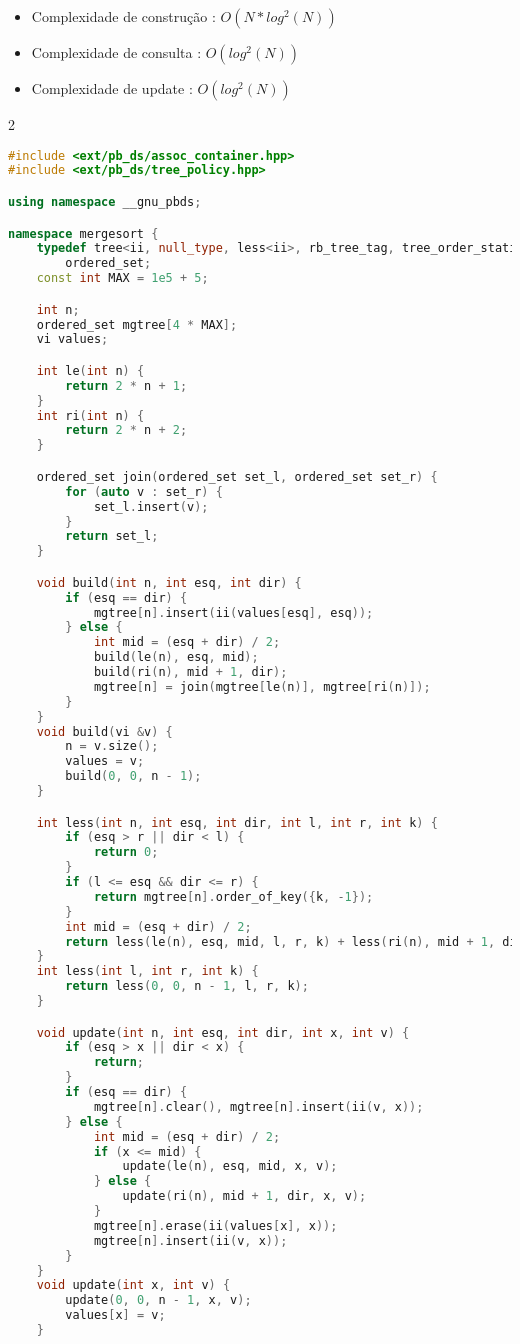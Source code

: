 \documentclass[11pt, a4paper, oneside]{book}
\begin{document}
\begin{itemize}
\item Complexidade de construção : $O(N * log^2(N))$
\item Complexidade de consulta : $O(log^2(N))$
\item Complexidade de update : $O(log^2(N))$
\end{itemize}

\hfill

\begin{multicols}{2}
\begin{lstlisting}[language=C++]
#include <ext/pb_ds/assoc_container.hpp>
#include <ext/pb_ds/tree_policy.hpp>

using namespace __gnu_pbds;

namespace mergesort {
    typedef tree<ii, null_type, less<ii>, rb_tree_tag, tree_order_statistics_node_update>
        ordered_set;
    const int MAX = 1e5 + 5;

    int n;
    ordered_set mgtree[4 * MAX];
    vi values;

    int le(int n) {
        return 2 * n + 1;
    }
    int ri(int n) {
        return 2 * n + 2;
    }

    ordered_set join(ordered_set set_l, ordered_set set_r) {
        for (auto v : set_r) {
            set_l.insert(v);
        }
        return set_l;
    }

    void build(int n, int esq, int dir) {
        if (esq == dir) {
            mgtree[n].insert(ii(values[esq], esq));
        } else {
            int mid = (esq + dir) / 2;
            build(le(n), esq, mid);
            build(ri(n), mid + 1, dir);
            mgtree[n] = join(mgtree[le(n)], mgtree[ri(n)]);
        }
    }
    void build(vi &v) {
        n = v.size();
        values = v;
        build(0, 0, n - 1);
    }

    int less(int n, int esq, int dir, int l, int r, int k) {
        if (esq > r || dir < l) {
            return 0;
        }
        if (l <= esq && dir <= r) {
            return mgtree[n].order_of_key({k, -1});
        }
        int mid = (esq + dir) / 2;
        return less(le(n), esq, mid, l, r, k) + less(ri(n), mid + 1, dir, l, r, k);
    }
    int less(int l, int r, int k) {
        return less(0, 0, n - 1, l, r, k);
    }

    void update(int n, int esq, int dir, int x, int v) {
        if (esq > x || dir < x) {
            return;
        }
        if (esq == dir) {
            mgtree[n].clear(), mgtree[n].insert(ii(v, x));
        } else {
            int mid = (esq + dir) / 2;
            if (x <= mid) {
                update(le(n), esq, mid, x, v);
            } else {
                update(ri(n), mid + 1, dir, x, v);
            }
            mgtree[n].erase(ii(values[x], x));
            mgtree[n].insert(ii(v, x));
        }
    }
    void update(int x, int v) {
        update(0, 0, n - 1, x, v);
        values[x] = v;
    }


\end{lstlisting}
\end{multicols}
\end{document}
